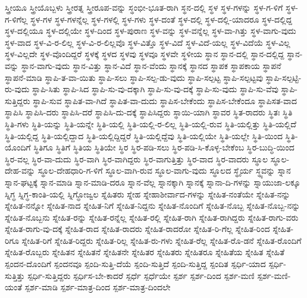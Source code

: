 {ಸ್ತ್ರೀಯೂ
ಸ್ತ್ರೀಯೊಬ್ಬಳು
ಸ್ತ್ರೀರತ್ನ
ಸ್ತ್ರೀರೂಪ-ವನ್ನು
ಸ್ಥಂಭೀ-ಭೂತ-ರಾಗಿ
ಸ್ಥನ-ದಲ್ಲಿ
ಸ್ಥಳ
ಸ್ಥಳ-ಗಳನ್ನು
ಸ್ಥಳ-ಗ-ಳಿಗೆ
ಸ್ಥಳ-ಗ-ಳಿಗೆಲ್ಲ
ಸ್ಥಳ-ಗಳ
ಸ್ಥಳ-ಗಳನ್ನೆಲ್ಲ
ಸ್ಥಳ-ಗಳಲ್ಲಿ
ಸ್ಥಳ-ಗಳು
ಸ್ಥಳ-ದಂತೆ
ಸ್ಥಳ-ದಲ್ಲಿ
ಸ್ಥಳ-ದಲ್ಲಿ-ಯಾದರೂ
ಸ್ಥಳ-ದಲ್ಲಿದ್ದ
ಸ್ಥಳ-ದಲ್ಲಿಯೂ
ಸ್ಥಳ-ದಲ್ಲಿಯೇ
ಸ್ಥಳ-ದಿಂದ
ಸ್ಥಳ-ಪುರಾಣ
ಸ್ಥಳ-ವನ್ನು
ಸ್ಥಳ-ವನ್ನೆಲ್ಲ
ಸ್ಥಳ-ವಾ-ಗಿತ್ತು
ಸ್ಥಳ-ವಾಗು-ವುದು
ಸ್ಥಳ-ವಾದ
ಸ್ಥಳ-ವಿ-ರ-ಲಿಲ್ಲ
ಸ್ಥಳ-ವಿ-ರ-ಲಿಲ್ಲವೊ
ಸ್ಥಳ-ವಿತ್ತೊ
ಸ್ಥಳ-ವಿದೆ
ಸ್ಥಳ-ವಿದೆ-ಯಲ್ಲ
ಸ್ಥಳ-ವಿದೆಯೆ
ಸ್ಥಳ-ವಿಲ್ಲ
ಸ್ಥಳ-ವಿಲ್ಲದೇ
ಸ್ಥಳ-ವೊಂದಿದ್ದರೆ
ಸ್ಥಳಕ್ಕೆ
ಸ್ಥಳದ
ಸ್ಥಳವು
ಸ್ಥಳವೂ
ಸ್ಥಳವೇ
ಸ್ಥಳೀಯ
ಸ್ಥಾನ
ಸ್ಥಾನ-ದಲ್ಲಿ
ಸ್ಥಾನ-ದಲ್ಲಿದ್ದ
ಸ್ಥಾನ-ವನ್ನು
ಸ್ಥಾನ-ವಾಗು-ವುದು
ಸ್ಥಾನ-ವಿತ್ತು
ಸ್ಥಾನ-ವಿದೆ
ಸ್ಥಾನ-ವೆಂದು
ಸ್ಥಾನಕ್ಕೆ
ಸ್ಥಾನದ
ಸ್ಥಾಪಕ
ಸ್ಥಾಪಕಾಯ
ಸ್ಥಾಪನೆ
ಸ್ಥಾಪನೆ-ಮಾಡಿ
ಸ್ಥಾಪಿ-ತ-ವಾ-ಯಿತು
ಸ್ಥಾಪಿ-ಸಲು
ಸ್ಥಾಪಿ-ಸಲ್ಪ-ಡು-ವುದು
ಸ್ಥಾಪಿ-ಸಲ್ಪಟ್ಟ
ಸ್ಥಾಪಿ-ಸಲ್ಪಟ್ಟವು
ಸ್ಥಾಪಿ-ಸಲ್ಪಟ್ಟಿ-ರು-ವುದು
ಸ್ಥಾಪಿ-ಸಿತು
ಸ್ಥಾಪಿ-ಸಿದ
ಸ್ಥಾಪಿ-ಸು-ವು-ದಕ್ಕಾಗಿ
ಸ್ಥಾಪಿ-ಸು-ವು-ದಕ್ಕೆ
ಸ್ಥಾಪಿ-ಸು-ವುದು
ಸ್ಥಾಪಿ-ಸು-ವೆವು
ಸ್ಥಾಪಿ-ಸುತ್ತಿದ್ದರು
ಸ್ಥಾಪಿ-ಸುವ
ಸ್ಥಾಪಿತ-ವಾ-ಗಿದೆ
ಸ್ಥಾಪಿತ-ವಾ-ದುದು
ಸ್ಥಾಪಿಸ-ಬೇಕೆಂದು
ಸ್ಥಾಪಿಸ-ಬೇಕೆಂದೂ
ಸ್ಥಾಪಿಸತ-ವಾದ
ಸ್ಥಾಪಿಸಿ
ಸ್ಥಾಪಿಸಿ-ದರು
ಸ್ಥಾಪಿಸಿ-ದರೆ
ಸ್ಥಾಪಿಸಿ-ದು-ದಕ್ಕೆ
ಸ್ಥಾಪಿಸಿದ್ದರು
ಸ್ಥಾಯಿ-ಯಾಗಿ
ಸ್ಥಾವರ
ಸ್ಥಿತ-ರಾದರು
ಸ್ಥಿತಃ
ಸ್ಥಿತಿ
ಸ್ಥಿತಿ-ಗಳು
ಸ್ಥಿತಿ-ಯನ್ನು
ಸ್ಥಿತಿ-ಯನ್ನೇ
ಸ್ಥಿತಿ-ಯಲ್ಲಿ
ಸ್ಥಿತಿ-ಯಲ್ಲಿ-ರ-ಲಿಲ್ಲ
ಸ್ಥಿತಿ-ಯಲ್ಲಿ-ರುವ
ಸ್ಥಿತಿ-ಯಲ್ಲಿತ್ತು
ಸ್ಥಿತಿ-ಯಲ್ಲಿದೆ
ಸ್ಥಿತಿ-ಯಲ್ಲಿದ್ದ
ಸ್ಥಿತಿ-ಯಲ್ಲಿದ್ದಾದ
ಸ್ಥಿತಿ-ಯಲ್ಲಿದ್ದಿದ್ದರೆ
ಸ್ಥಿತಿ-ಯಲ್ಲಿದ್ದೆವು
ಸ್ಥಿತಿ-ಯಲ್ಲಿಯೇ
ಸ್ಥಿತಿ-ಯಲ್ಲೇ
ಸ್ಥಿತಿ-ಯಿಂದ
ಸ್ಥಿತಿ-ಯೊಂದಿಗೆ
ಸ್ಥಿತಿಗೂ
ಸ್ಥಿತಿಗೆ
ಸ್ಥಿತಿಯ
ಸ್ಥಿತಿಯೇ
ಸ್ಥಿರ
ಸ್ಥಿರ-ಪಡಿ-ಸಲು
ಸ್ಥಿರ-ಪಡಿ-ಸಿ-ಕೊಳ್ಳ-ಬೇಕೆಂಬ
ಸ್ಥಿರ-ಬುದ್ಧಿ-ಯಿಂದ
ಸ್ಥಿರ-ವಲ್ಲ
ಸ್ಥಿರ-ವಾ-ದುದು
ಸ್ಥಿರ-ವಾಗಿ
ಸ್ಥಿರ-ವಾಗಿದ್ದರು
ಸ್ಥಿರ-ವಾಗುತ್ತಿತ್ತು
ಸ್ಥಿರ-ವಾದ
ಸ್ಥಿರ-ವಾದರು
ಸ್ಥೂಲ
ಸ್ಥೂಲ-ದೇಹ-ವನ್ನು
ಸ್ಥೂಲ-ದೇಹಧಾರಿ-ಗ-ಳಿಗೆ
ಸ್ಥೂಲ-ವಾಗಿ-ರುವ
ಸ್ಥೂಲ-ವಾಗು-ವುದು
ಸ್ಥೂಲದ
ಸ್ಥೈರ್ಯ
ಸ್ಥ್ಯವನ್ನು
ಸ್ನಾನ
ಸ್ನಾನ-ಘಟ್ಟಕ್ಕೆ
ಸ್ನಾನ-ಮಾಡಿ
ಸ್ನಾನ-ಮಾಡಿ-ದರೂ
ಸ್ನಾನ-ವೆಲ್ಲ
ಸ್ನಾನಕ್ಕಾಗಿ
ಸ್ನಾನಕ್ಕೆ
ಸ್ನಾನಾ-ದಿ-ಗಳನ್ನು
ಸ್ನಾಯುಜಾ-ಲಕ್ಕೂ
ಸ್ನಿಗ್ಧ
ಸ್ನಿಗ್ಧ-ಕಾಂತಿ-ಯಲ್ಲಿ
ಸ್ನಿಗ್ಧೋಜ್ವಲ
ಸ್ನೆಹಿತರು
ಸ್ನೇಹ
ಸ್ನೇಹಾಶೀರ್ವಾದ-ಗಳನ್ನು
ಸ್ನೇಹಿತ-ನಂತೆಯೇ
ಸ್ನೇಹಿತ-ನನ್ನು
ಸ್ನೇಹಿತ-ನನ್ನೋ
ಸ್ನೇಹಿತ-ನಾದ
ಸ್ನೇಹಿತ-ನಿಗೆ
ಸ್ನೇಹಿತ-ನಿದ್ದನು
ಸ್ನೇಹಿತ-ನೊಂದಿಗೆ
ಸ್ನೇಹಿತ-ನೊಬ್ಬ
ಸ್ನೇಹಿತ-ನೊಬ್ಬ-ನನ್ನು
ಸ್ನೇಹಿತ-ನೊಬ್ಬನು
ಸ್ನೇಹಿತ-ರನ್ನು
ಸ್ನೇಹಿತ-ರನ್ನೆಲ್ಲ
ಸ್ನೇಹಿತ-ರಲ್ಲಿ
ಸ್ನೇಹಿತ-ರಾಗಿ
ಸ್ನೇಹಿತ-ರಾಗಿದ್ದರು
ಸ್ನೇಹಿತ-ರಾಗು-ವರು
ಸ್ನೇಹಿತ-ರಾಗು-ವು-ದಕ್ಕೆ
ಸ್ನೇಹಿತ-ರಾದ
ಸ್ನೇಹಿತ-ರಾದರು
ಸ್ನೇಹಿತ-ರಾದರೋ
ಸ್ನೇಹಿತ-ರಿ-ಗೆಲ್ಲ
ಸ್ನೇಹಿತ-ರಿಂದ
ಸ್ನೇಹಿತ-ರಿಗೂ
ಸ್ನೇಹಿತ-ರಿಗೆ
ಸ್ನೇಹಿತ-ರಿದ್ದರು
ಸ್ನೇಹಿತ-ರಿಲ್ಲ
ಸ್ನೇಹಿತ-ರು-ಗಳು
ಸ್ನೇಹಿತ-ರೆಲ್ಲ
ಸ್ನೇಹಿತ-ರೊ-ಡನೆ
ಸ್ನೇಹಿತ-ರೊಂದಿಗೆ
ಸ್ನೇಹಿತ-ರೊಬ್ಬರು
ಸ್ನೇಹಿತನ
ಸ್ನೇಹಿತನೆ
ಸ್ನೇಹಿತನೇ
ಸ್ನೇಹಿತರ
ಸ್ನೇಹಿತರು
ಸ್ನೇಹಿತರೂ
ಸ್ನೇಹಿತೆಯ
ಸ್ನೇಹಿತ
ಸ್ನೇಹಿತೆ
ಸ್ಪಂದನ-ದೊಂದಿಗೆ
ಸ್ಪಂದನವೂ
ಸ್ಪಂದಿ-ಸುತ್ತಿ-ದೆಯೆ
ಸ್ಪಂದಿ-ಸುತ್ತಿದೆ
ಸ್ಪಂದಿ-ಸುತ್ತಿದ್ದ
ಸ್ಪಂದಿತ
ಸ್ಪರ್ಧಿ-ಯಾದ
ಸ್ಪರ್ಧಿ-ಸುತ್ತಿತ್ತು
ಸ್ಪರ್ಧಿ-ಸುತ್ತಿದ್ದರು
ಸ್ಪರ್ಧಿಸ-ಬೇ-ಕಾದರೆ
ಸ್ಪರ್ಧೆ
ಸ್ಪರ್ಧೆಯೇ
ಸ್ಪರ್ಶ
ಸ್ಪರ್ಶ-ದಿಂದ
ಸ್ಪರ್ಶ-ಮಣಿ
ಸ್ಪರ್ಶ-ಮಣಿ-ಯಂತೆ
ಸ್ಪರ್ಶ-ಮಾಡಿ
ಸ್ಪರ್ಶ-ಮಾತ್ರ-ದಿಂದ
ಸ್ಪರ್ಶ-ಮಾತ್ರ-ದಿಂದಲೇ
}
